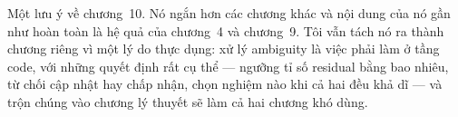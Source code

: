 \documentclass[../marker.tex]{subfiles}
\begin{document}
Một lưu ý về chương~10. Nó ngắn hơn các chương khác và nội dung của nó gần như hoàn toàn là hệ quả của chương~4 và chương~9. Tôi vẫn tách nó ra thành chương riêng vì một lý do thực dụng: xử lý ambiguity là việc phải làm ở tầng code, với những quyết định rất cụ thể --- ngưỡng tỉ số residual bằng bao nhiêu, từ chối cập nhật hay chấp nhận, chọn nghiệm nào khi cả hai đều khả dĩ --- và trộn chúng vào chương lý thuyết sẽ làm cả hai chương khó dùng.









\ifSubfilesClassLoaded{\printbibliography[title={Nguồn}]}{}
\end{document}
